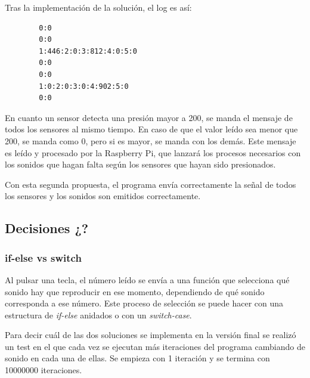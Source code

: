 \documentclass{article}
\begin{document}
        Tras la implementación de la solución, el log es así:

        \begin{verbatim}
        0:0
        0:0
        1:446:2:0:3:812:4:0:5:0
        0:0
        0:0
        1:0:2:0:3:0:4:902:5:0
        0:0
        \end{verbatim}

        En cuanto un sensor detecta una presión mayor a 200, se manda el mensaje de todos los sensores al mismo tiempo.
        En caso de que el valor leído sea menor que 200, se manda como 0, pero si es mayor, se manda con los demás. Este
        mensaje es leído y procesado por la Raspberry Pi, que lanzará los procesos necesarios con los sonidos que hagan
        falta según los sensores que hayan sido presionados.\newline

        Con esta segunda propuesta, el programa envía correctamente la señal de todos los sensores y los sonidos son
        emitidos correctamente.


    \subsection{Decisiones ¿?} %
    \label{sub:Decisiones}

        \subsubsection{if-else vs switch} %
        \label{ssub:if-else_vs_switch}

            Al pulsar una tecla, el número leído se envía a una función que selecciona qué sonido hay que reproducir en
            ese momento, dependiendo de qué sonido corresponda a ese número. Este proceso de selección se puede hacer
            con una estructura de \textit{if-else} anidados o con un \textit{switch-case}.\newline

            Para decir cuál de las dos soluciones se implementa en la versión final se realizó un test en el que cada
            vez se ejecutan más iteraciones del programa cambiando de sonido en cada una de ellas. Se empieza con 1
            iteración y se termina con 10000000 iteraciones.\newline
\end{document}
